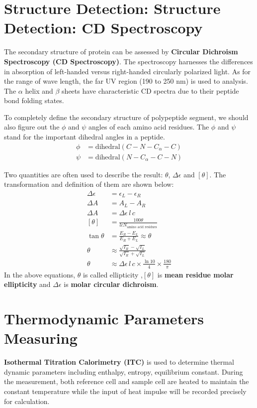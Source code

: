 \documentclass{report}
\begin{document}
\section{Structure Detection: Structure Detection: CD Spectroscopy}
The secondary structure of protein can be assessed by \textbf{Circular Dichroism Spectroscopy (CD Spectroscopy)}\cite{Lehninger}.
The spectroscopy harnesses the differences in absorption of left-handed versus right-handed circularly polarized light.
As for the range of wave length, the far UV region (190 to 250 nm) is used to analysis.
The $\alpha$ helix and $\beta$ sheets have characteristic CD spectra due to their peptide bond folding states.

To completely define the secondary structure of polypeptide segment, we should also figure out the $\phi$ and $\psi$ angles of each amino acid residues.
The $\phi$ and $\psi$ stand for the important dihedral angles in a peptide.
\begin{align}
    \phi &= \text{dihedral}(C-N-C_{\alpha}-C)\\
    \psi &= \text{dihedral}(N-C_{\alpha}-C-N)
\end{align}

Two quantities are often used to describe the result: $\theta$, $\Delta \epsilon$ and $[\theta]$.
The transformation and definition of them are shown below:
\begin{align}
    \Delta \epsilon &= \epsilon_{L}-\epsilon_{R}\\
    \Delta A &= A_{L}-A_{R}\\
    \Delta A &= \Delta \epsilon \, l \, c\\
    [\theta] &= \frac{100\theta}{lcN_{\text{amino acid residues}}}\\
    \tan \theta &= \frac{E_{R} - E_{L}}{E_{R} + E_{L}} \approx \theta\\
    \theta &\approx \frac{\sqrt{I_{R}} - \sqrt{I_{L}}}{\sqrt{I_{R}} + \sqrt{I_{L}}}\\
    \theta &\approx \Delta \epsilon \, l \, c \times \frac{\ln 10}{4} \times \frac{180}{\pi}
\end{align}
In the above equations, $\theta$ is called ellipticity ,$[\theta]$ is \textbf{mean residue molar ellipticity} and $\Delta \epsilon$ is \textbf{molar circular dichroism}.
\section{Thermodynamic Parameters Measuring}
\textbf{Isothermal Titration Calorimetry (ITC)} is used to determine thermal dynamic parameters including enthalpy, entropy, equilibrium constant.
During the measurement, both reference cell and sample cell are heated to maintain the constant temperature while the input of heat impulse will be recorded precisely for calculation.
\end{document}

